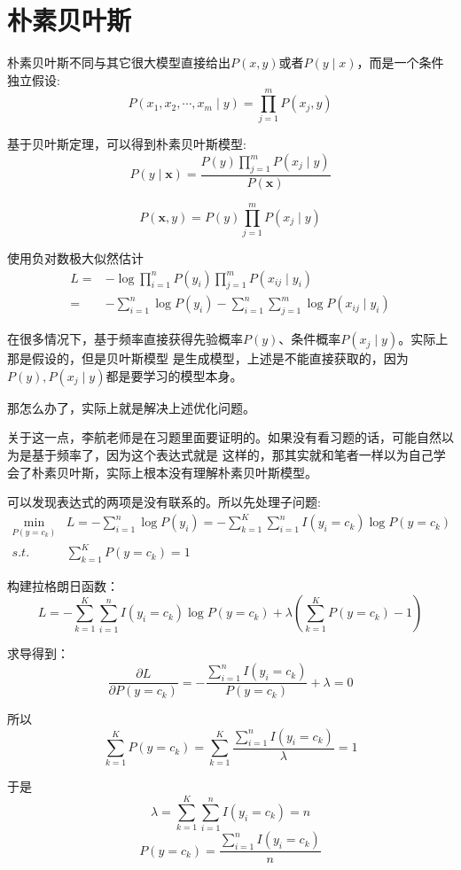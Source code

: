 \documentclass{article}
\begin{document}
    \section{朴素贝叶斯}
    朴素贝叶斯不同与其它很大模型直接给出$P(x,y)$或者$P(y\mid x)$，而是一个条件独立假设:
    \[P(x_1,x_2,\cdots,x_m\mid y)=\prod_{j=1}^{m}P(x_j,y)\]

    基于贝叶斯定理，可以得到朴素贝叶斯模型:
    \[P(y\mid \boldsymbol{x})=\frac{P(y)\prod_{j=1}^{m}P(x_j\mid y)}{P(\boldsymbol{x})}\]

    \[P(\boldsymbol{x},y)=P(y)\prod_{j=1}^{m}P(x_j\mid y)\]

    使用负对数极大似然估计
    \begin{align*}
        L=&-\log \prod_{i=1}^{n}P(y_i)\prod_{j=1}^{m}P(x_{ij}\mid y_i)\\
         =&-\sum_{i=1}^{n}\log P(y_i)-\sum_{i=1}^{n}\sum_{j=1}^{m}\log P(x_{ij}\mid y_i)   
    \end{align*}

    在很多情况下，基于频率直接获得先验概率$P(y)$、条件概率$P(x_{j}\mid y)$。实际上那是假设的，但是贝叶斯模型
    是生成模型，上述是不能直接获取的，因为$P(y),P(x_{j}\mid y)$都是要学习的模型本身。

    那怎么办了，实际上就是解决上述优化问题。
    
    关于这一点，李航老师是在习题里面要证明的。如果没有看习题的话，可能自然以为是基于频率了，因为这个表达式就是
    这样的，那其实就和笔者一样以为自己学会了朴素贝叶斯，实际上根本没有理解朴素贝叶斯模型。

    可以发现表达式的两项是没有联系的。所以先处理子问题:
    \begin{align*}
        \min_{P(y=c_k)} &L= -\sum_{i=1}^{n}\log P(y_i)=-\sum_{k=1}^{K}\sum_{i=1}^{n}I(y_i=c_k)\log P(y=c_k)\\
        s.t. &\sum_{k=1}^{K}P(y=c_k)=1
    \end{align*}

    构建拉格朗日函数：
    \[L=-\sum_{k=1}^{K}\sum_{i=1}^{n}I(y_i=c_k)\log P(y=c_k)+\lambda (\sum_{k=1}^{K}P(y=c_k)-1)\]

    求导得到：
    \[\frac{\partial L}{\partial P(y=c_k)}=-\frac{\sum_{i=1}^{n}I(y_i=c_k)}{P(y=c_k)}+\lambda=0\]

    所以
    \[\sum_{k=1}^{K}P(y=c_k)=\sum_{k=1}^{K}\frac{\sum_{i=1}^{n}I(y_i=c_k)}{\lambda}=1\]

    于是
    \[\lambda=\sum_{k=1}^{K}\sum_{i=1}^{n}I(y_i=c_k)=n\]
    \[P(y=c_k)=\frac{\sum_{i=1}^{n}I(y_i=c_k)}{n}\]
\end{document}
